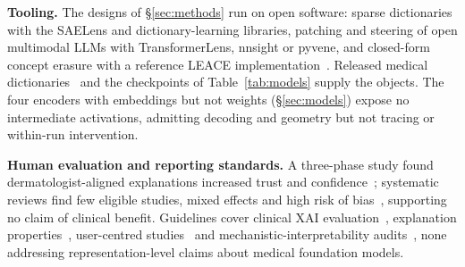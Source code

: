 \textbf{Tooling.} The designs of \S\ref{sec:methods} run on open software: sparse dictionaries with the
SAELens and dictionary-learning libraries, patching and
steering of open multimodal LLMs with TransformerLens, nnsight or pyvene, and closed-form concept erasure
with a reference LEACE implementation~\cite{belrose2023leace}. Released medical
dictionaries~\cite{abdulaal2024an,nooralahzadeh2026universal} and the checkpoints of
Table~\ref{tab:models} supply the objects. The four encoders with embeddings but not weights
(\S\ref{sec:models}) expose no intermediate activations, admitting decoding and geometry but not tracing
or within-run intervention.

\textbf{Human evaluation and reporting standards.} A three-phase study found dermatologist-aligned
explanations increased trust and confidence~\cite{chanda2023dermatologist}; systematic reviews find few eligible studies, mixed effects
and high risk of bias~\cite{rosenbacke2024how,uddin2026which,gambetti2025a}, supporting no claim of
clinical benefit. Guidelines cover clinical XAI
evaluation~\cite{jin2022guidelines,chen2021humancentered}, explanation
properties~\cite{nauta2023interpreting}, user-centred studies~\cite{rong2022userstudies,donosoguzman2025a}
and mechanistic-interpretability audits~\cite{lan2026auditable}, none addressing representation-level
claims about medical foundation models.
